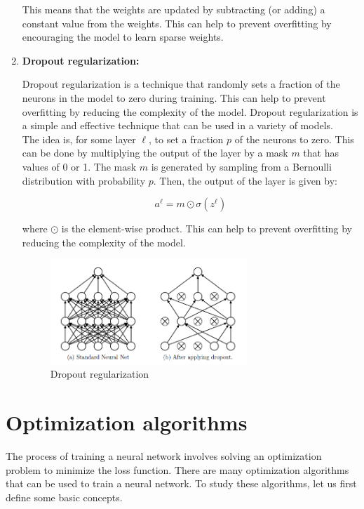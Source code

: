 \begin{enumerate}
    This means that the weights are updated by subtracting (or adding) a constant value from
    the weights. This can help to prevent overfitting by encouraging the model to learn
    sparse weights.\\


    \item \textbf{Dropout regularization:}
    
    Dropout regularization is a technique that randomly sets a fraction of the
    neurons in the model to zero during training. This can help to prevent
    overfitting by reducing the complexity of the model. Dropout regularization
    is a simple and effective technique that can be used in a variety of models.\\

    The idea is, for some layer $\ell$, to set a fraction $p$ of the neurons to zero.
    This can be done by multiplying the output of the layer by a mask $m$ that has
    values of 0 or 1. The mask $m$ is generated by sampling from a Bernoulli distribution
    with probability $p$. Then, the output of the layer is given by:

    $$a^\ell = m \odot \sigma(z^\ell)$$

    where $\odot$ is the element-wise product. This can help to prevent overfitting
    by reducing the complexity of the model.

    \begin{figure}[H]
        \centering
        \includegraphics[width=0.7\textwidth]{figures/dropout.png}
        \caption{Dropout regularization}
        \label{fig:dropout}
    \end{figure}

\end{enumerate}

\section{Optimization algorithms}

The process of training a neural network involves solving an optimization problem
to minimize the loss function. There are many optimization algorithms that can be
used to train a neural network. To study these algorithms, let us first define
some basic concepts.\\

